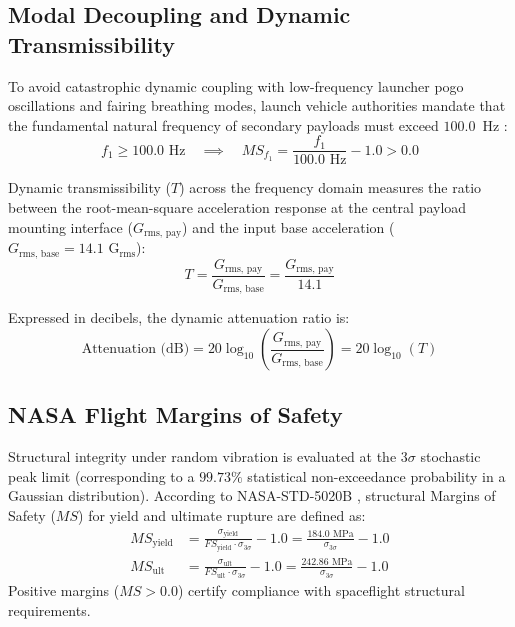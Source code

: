 \documentclass[preprint,12pt,3p]{elsarticle}
\newcommand{\Grmspay}{G_{\text{rms, pay}}}
\newcommand{\Grmsbase}{G_{\text{rms, base}}}
\begin{document}
\subsection{Modal Decoupling and Dynamic Transmissibility}
To avoid catastrophic dynamic coupling with low-frequency launcher pogo oscillations and fairing breathing modes, launch vehicle authorities mandate that the fundamental natural frequency of secondary payloads must exceed $100.0$~Hz \cite{calpoly2022}:
\begin{equation}
  f_1 \ge 100.0\text{ Hz} \quad \implies \quad MS_{f_1} = \frac{f_1}{100.0\text{ Hz}} - 1.0 > 0.0
  \label{eq:f1_limit}
\end{equation}

Dynamic transmissibility ($T$) across the frequency domain measures the ratio between the root-mean-square acceleration response at the central payload mounting interface ($\Grmspay$) and the input base acceleration ($\Grmsbase = 14.1\text{ G}_{\text{rms}}$):
\begin{equation}
  T = \frac{\Grmspay}{\Grmsbase} = \frac{\Grmspay}{14.1}
  \label{eq:transmissibility}
\end{equation}

Expressed in decibels, the dynamic attenuation ratio is:
\begin{equation}
  \text{Attenuation (dB)} = 20 \log_{10} \left( \frac{\Grmspay}{\Grmsbase} \right) = 20 \log_{10}(T)
  \label{eq:attenuation_db}
\end{equation}

\subsection{NASA Flight Margins of Safety}
Structural integrity under random vibration is evaluated at the $3\sigma$ stochastic peak limit (corresponding to a $99.73\%$ statistical non-exceedance probability in a Gaussian distribution). According to NASA-STD-5020B \cite{nasa2022}, structural Margins of Safety ($MS$) for yield and ultimate rupture are defined as:
\begin{align}
  MS_{\text{yield}} &= \frac{\sigma_{\text{yield}}}{FS_{\text{yield}} \cdot \sigma_{3\sigma}} - 1.0 = \frac{184.0\text{ MPa}}{\sigma_{3\sigma}} - 1.0 \label{eq:ms_yield} \\
  MS_{\text{ult}} &= \frac{\sigma_{\text{ult}}}{FS_{\text{ult}} \cdot \sigma_{3\sigma}} - 1.0 = \frac{242.86\text{ MPa}}{\sigma_{3\sigma}} - 1.0 \label{eq:ms_ult}
\end{align}
Positive margins ($MS > 0.0$) certify compliance with spaceflight structural requirements.
\end{document}

